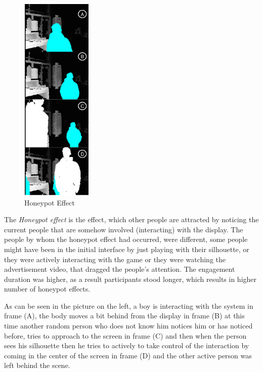 \begin{figure}
  \vspace{-20pt}
  \begin{center}
    \includegraphics[width=0.3\textwidth,height=100mm]{figures/8/body_inter_findings/effects/honeypot}
  \end{center}
  \vspace{-20pt}
  \caption{Honeypot Effect}
  \vspace{-20pt}
\end{figure}
The \emph{Honeypot effect} is the effect, which other people are attracted by noticing the current people that are somehow involved (interacting) with the display. The people by whom the honeypot effect had occurred, were different, some people might have been in the initial interface by just playing with their silhouette, or they were actively interacting with the game or they were watching the advertisement video, that dragged the people’s attention. The engagement duration was higher, as a result participants stood longer, which results in higher number of honeypot effects.

As can be seen in the picture on the left, a boy is interacting with the system in frame (A), the body moves a bit behind from the display in frame (B) at this time another random person who does not know him notices him or has noticed before, tries to approach to the screen in frame (C) and then when the person sees his silhouette then he tries to actively to take control of the interaction by coming in the center of the screen in frame (D) and the other active person was left behind the scene.

